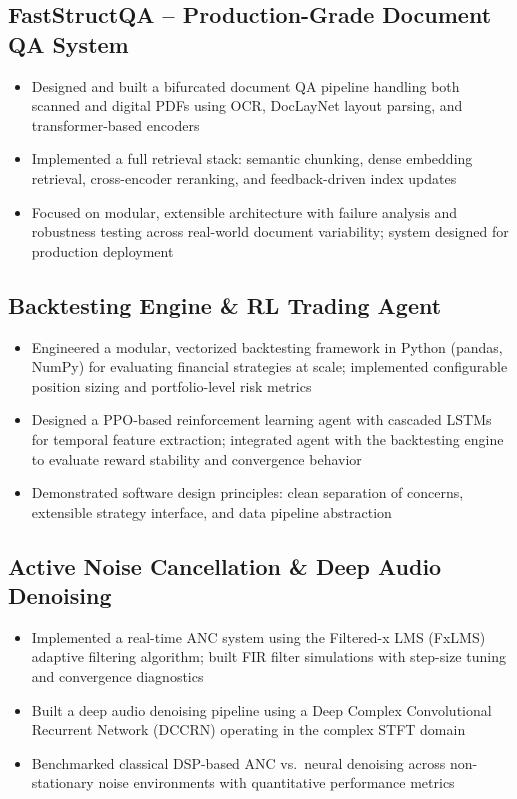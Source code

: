\documentclass[a4paper,11pt]{article}
\begin{document}
\subsection{FastStructQA -- Production-Grade Document QA System}
\begin{itemize}[leftmargin=15pt, itemsep=1pt]
    \item Designed and built a bifurcated document QA pipeline handling both scanned and digital PDFs using OCR, DocLayNet layout parsing, and transformer-based encoders
    \item Implemented a full retrieval stack: semantic chunking, dense embedding retrieval, cross-encoder reranking, and feedback-driven index updates
    \item Focused on modular, extensible architecture with failure analysis and robustness testing across real-world document variability; system designed for production deployment
\end{itemize}

\subsection{Backtesting Engine \& RL Trading Agent}
\begin{itemize}[leftmargin=15pt, itemsep=1pt]
    \item Engineered a modular, vectorized backtesting framework in Python (pandas, NumPy) for evaluating financial strategies at scale; implemented configurable position sizing and portfolio-level risk metrics
    \item Designed a PPO-based reinforcement learning agent with cascaded LSTMs for temporal feature extraction; integrated agent with the backtesting engine to evaluate reward stability and convergence behavior
    \item Demonstrated software design principles: clean separation of concerns, extensible strategy interface, and data pipeline abstraction
\end{itemize}

\subsection{Active Noise Cancellation \& Deep Audio Denoising}
\begin{itemize}[leftmargin=15pt, itemsep=1pt]
    \item Implemented a real-time ANC system using the Filtered-x LMS (FxLMS) adaptive filtering algorithm; built FIR filter simulations with step-size tuning and convergence diagnostics
    \item Built a deep audio denoising pipeline using a Deep Complex Convolutional Recurrent Network (DCCRN) operating in the complex STFT domain
    \item Benchmarked classical DSP-based ANC vs.\ neural denoising across non-stationary noise environments with quantitative performance metrics
\end{itemize}
\end{document}

